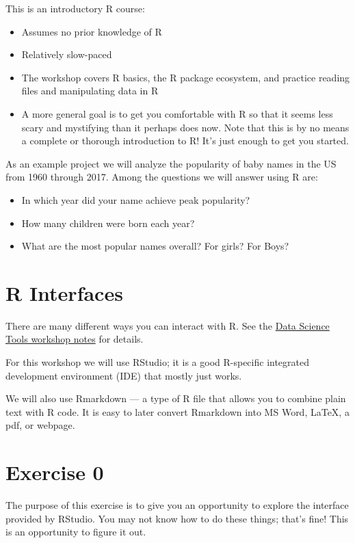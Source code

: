 \documentclass[]{book}
\providecommand{\tightlist}{%
  \setlength{\itemsep}{0pt}\setlength{\parskip}{0pt}}
\begin{document}
This is an introductory R course:

\begin{itemize}
\tightlist
\item
  Assumes no prior knowledge of R
\item
  Relatively slow-paced
\item
  The workshop covers R basics, the R package ecosystem, and practice
  reading files and manipulating data in R
\item
  A more general goal is to get you comfortable with R so that it seems
  less scary and mystifying than it perhaps does now. Note that this is
  by no means a complete or thorough introduction to R! It's just enough
  to get you started.
\end{itemize}

As an example project we will analyze the popularity of baby names in
the US from 1960 through 2017. Among the questions we will answer using
R are:

\begin{itemize}
\tightlist
\item
  In which year did your name achieve peak popularity?
\item
  How many children were born each year?
\item
  What are the most popular names overall? For girls? For Boys?
\end{itemize}

\section{R Interfaces}\label{r-interfaces}

There are many different ways you can interact with R. See the
\href{http://tutorials.iq.harvard.edu/Other/DataScienceTools/DataScienceTools.html}{Data
Science Tools workshop notes} for details.

For this workshop we will use RStudio; it is a good R-specific
integrated development environment (IDE) that mostly just works.

We will also use Rmarkdown --- a type of R file that allows you to
combine plain text with R code. It is easy to later convert Rmarkdown
into MS Word, LaTeX, a pdf, or webpage.

\section{Exercise 0}\label{exercise-0}

The purpose of this exercise is to give you an opportunity to explore
the interface provided by RStudio. You may not know how to do these
things; that's fine! This is an opportunity to figure it out.
\end{document}
